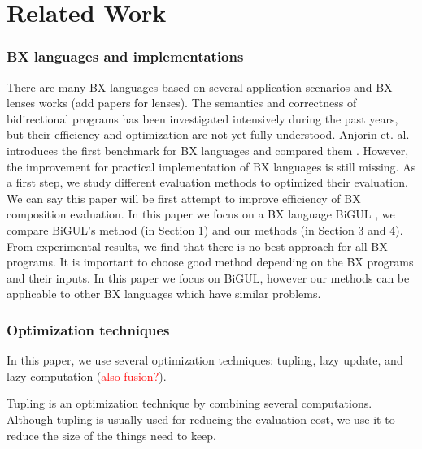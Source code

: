 \section{Related Work}

\subsubsection*{BX languages and implementations}

There are many BX languages \cite{josh_pepm} \cite{BXtend} \cite{eMoflon} \cite{EVL+Strace} \cite{JTL} \cite{NMF}
based on several application scenarios and BX lenses works \cite{} (add papers for lenses). The semantics and correctness of bidirectional programs has been investigated intensively during the past years, but their efficiency and optimization are not yet fully understood. Anjorin et. al. introduces the first benchmark for BX languages and compared them \cite{BXcomp}. However, the improvement for practical implementation of BX languages is still missing. As a first step, we study different evaluation methods to optimized their evaluation. We can say this paper will be first attempt to improve efficiency of BX composition evaluation. In this paper we focus on a BX language BiGUL \cite{josh_pepm} \cite{josh_popl}, we compare BiGUL's method (in Section 1) and our methods (in Section 3 and 4). From experimental results, we find that there is no best approach for all BX programs. It is important to choose good method depending on the BX programs and their inputs. In this paper we focus on BiGUL, however our methods can be applicable to other BX languages which have similar problems.

\subsubsection*{Optimization techniques}

In this paper, we use several optimization techniques: tupling, lazy update, and lazy computation (\textcolor{red}{also fusion?}).

Tupling \cite{tupling} is an optimization technique by combining several computations. Although tupling is usually used for reducing the evaluation cost\cite{}, we use it to reduce the size of the things need to keep.

